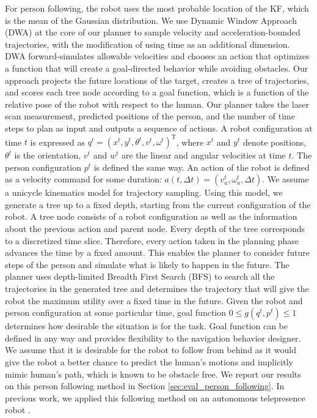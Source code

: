 \documentclass[3p]{elsarticle}
\begin{document}
For person following, the robot uses the most probable location of the KF, which is the mean of the Gaussian distribution. We use Dynamic Window Approach (DWA) \cite{fox1997dynamic} at the core of our planner to sample velocity and acceleration-bounded trajectories, with the modification of using time as an additional dimension. DWA forward-simulates allowable velocities and chooses an action that optimizes a function that will create a goal-directed behavior while avoiding obstacles. Our approach projects the future locations of the target, creates a tree of trajectories, and scores each tree node according to a goal function, which is a function of the relative pose of the robot with respect to the human. Our planner takes the laser scan measurement, predicted positions of the person, and the number of time steps to plan as input and outputs a sequence of actions. A robot configuration at time $t$ is expressed as \(q^t=(x^t,y^t,\theta^t,v^t,\omega^t)^\mathrm{T}\), where $x^t$ and $y^t$ denote positions, $\theta^t$ is the orientation, $v^t$ and $w^t$ are the linear and angular velocities at time $t$. The person configuration \(p^t\) is defined the same way. An action of the robot is defined as a velocity command for some duration: $a(t,\Delta t)=(v^t_a,\omega^t_a,\Delta t)$. We assume a unicycle kinematics model for trajectory sampling. Using this model, we generate a tree up to a fixed depth, starting from the current configuration of the robot. A tree node consists of a robot configuration as well as the information about the previous action and parent node. Every depth of the tree corresponds to a discretized time slice. Therefore, every action taken in the planning phase advances the time by a fixed amount. This enables the planner to consider future steps of the person and simulate what is likely to happen in the future. The planner uses depth-limited Breadth First Search (BFS) to search all the trajectories in the generated tree and determines the trajectory that will give the robot the maximum utility over a fixed time in the future. Given the robot and person configuration at some particular time, goal function \(0 \leq g(q^t,p^t) \leq 1\) determines how desirable the situation is for the task. Goal function can be defined in any way and provides flexibility to the navigation behavior designer. We assume that it is desirable for the robot to follow from behind as it would give the robot a better chance to predict the human's motions and implicitly mimic human's path, which is known to be obstacle free. We report our results on this person following method in Section \ref{sec:eval_person_following}. In previous work, we applied this following method on an autonomous telepresence robot \cite{cosgun2013autonomous}. 
\end{document}
